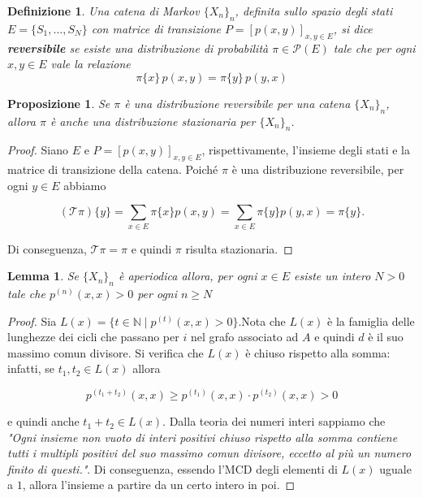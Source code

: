 \documentclass{article}
\newtheorem{definition}{Definizione}[section]
\newtheorem{proposition}{Proposizione}[section]
\newtheorem{lemma}{Lemma}[section]
\begin{document}
\begin{definition}
    \label{def:reversibile}
    Una catena di Markov $\{X_n\}_n$, definita sullo spazio degli stati $E = \{S_1, \ldots, S_N\}$ con matrice di transizione $P = [p(x,y)]_{x,y \in E}$, si dice \textbf{reversibile} se esiste una distribuzione di probabilità $\pi \in \mathcal{P}(E)$ tale che per ogni $x, y \in E$ vale la relazione
    \[
    \pi\{x\} \, p(x,y) = \pi\{y\} \, p(y,x)
    \]
\end{definition}

%

\begin{proposition}
\label{prp:rev_staz}
Se $\pi$ è una distribuzione reversibile per una catena $\{X_n\}_{n}$, allora $\pi$ è anche una distribuzione stazionaria per $\{X_n\}_{n}$.
\end{proposition}
\begin{proof}
    Siano $E$ e $P = [p(x, y)]_{x,y \in E}$, rispettivamente, l’insieme degli stati e la matrice di transizione della catena. Poiché $\pi$ è una distribuzione reversibile, per ogni $y \in E$ abbiamo

    $$(\mathcal{T}\pi)\{y\} = \sum_{x \in E} \pi\{x\} p(x, y) = \sum_{x \in E} \pi\{y\} p(y, x)  = \pi\{y\}.$$

    Di conseguenza, $ \mathcal{T}\pi= \pi$ e quindi $\pi$ risulta stazionaria.
\end{proof}

\begin{lemma}
\label{lemma:aperiodica}
Se $\{X_n\}_{n}$ è aperiodica allora, per ogni $x \in E$ esiste un intero $N > 0$ tale che $p^{(n)}(x,x) > 0$ per ogni $n\geq N$
\end{lemma}
\begin{proof}
Sia $L(x) = \{t \in \mathbb{N} \mid p^{(t)}(x,x) > 0\}. $Nota che $L(x)$ è la famiglia delle lunghezze dei cicli che passano per $i$ nel grafo associato ad $A$ e quindi $d$ è il suo massimo comun divisore. Si verifica che $L(x)$ è chiuso rispetto alla somma: infatti, se $t_1, t_2 \in L(x)$ allora

$$p^{(t_1+t_2)}(x,x) \geq p^{(t_1)}(x,x) \cdot p^{(t_2)}(x,x) > 0$$

e quindi anche $t_1 + t_2 \in L(x)$. Dalla teoria dei numeri interi sappiamo che \textit{"Ogni insieme non vuoto di interi positivi chiuso rispetto alla somma contiene tutti i multipli positivi del suo massimo comun divisore, eccetto al più un numero finito di questi."}. Di conseguenza, essendo l'MCD degli elementi di $L(x)$ uguale a $1$, allora l'insieme a partire da un certo intero in poi.
\end{proof}
\end{document}
